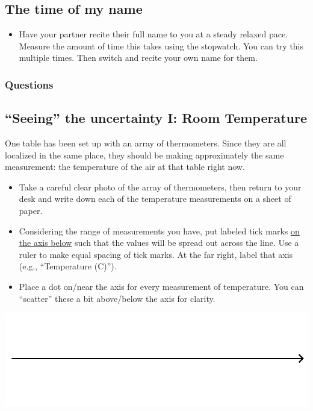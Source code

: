 \subsection{The time of my name}

\begin{itemize}
\item Have your partner recite their full name to you at a steady relaxed pace.  Measure the amount of time this takes using the stopwatch.  You can try this multiple times.  Then switch and recite your own name for them.
\end{itemize}
%
\subsubsection*{Questions}
\begin{questions}
\end{questions}



\subsection{``Seeing'' the uncertainty I: Room Temperature}

One table has been set up with an array of thermometers.  Since they are all localized in the same place, they should be making approximately the same measurement: the temperature of the air at that table right now.
	\begin{itemize}
	\item Take a careful clear photo of the array of thermometers, then return to your desk and write down each of the temperature measurements on a sheet of paper.
	\item Considering the range of measurements you have, put labeled tick marks \underline{on the axis below} such that the values will be spread out across the line. Use a ruler to make equal spacing of tick marks.  At the far right, label that axis (e.g., ``Temperature (C)'').
	\item Place a dot on/near the axis for every measurement of temperature.  You can ``scatter'' these a bit above/below the axis for clarity.
	\end{itemize}
\begin{center}
\includegraphics[width=\textwidth]{images/01_axis}
\end{center}
